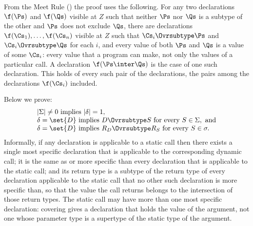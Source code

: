From the Meet Rule () the proof uses the following.
For any two declarations $\f(\Ps)$ and $\f(\Qs)$ visible at $Z$ such that
neither $\Ps$ nor $\Qs$ is a subtype of the other and $\Ps$ does not exclude
$\Qs$, there are declarations $\f(\Cs_1), \ldots, \f(\Cs_n)$ visible at $Z$
such that $\Cs_i \Ovrsubtype \Ps$ and $\Cs_i \Ovrsubtype \Qs$ for each $i$, and
every value of both $\Ps$ and $\Qs$ is a value of some $\Cs_i$: every value that
a program can make, not only the values of a particular call.
A declaration $\f(\Ps \inter \Qs)$ is the case of one such declaration.
This holds of every such pair of the declarations, the pairs among the
declarations $\f(\Cs_i)$ included.

Below we prove:
\[
\begin{array}{l}
|\Sigma| \neq 0 \ \text{implies} \ |\delta| = 1,
\\
\delta = \set{D} \ \text{implies} \ D \Ovrsubtype S \ \text{for every} \ S \in \Sigma, \ \text{and}
\\
\delta = \set{D} \ \text{implies} \ R_D \Ovrsubtype R_S \ \text{for every} \ S \in \sigma.
\end{array}
\]
Informally, if any declaration is applicable to a static call then there
exists a single most specific declaration that is applicable to the
corresponding dynamic call; it is the same as or more specific than every
declaration that is applicable to the static call; and its return type is a
subtype of the return type of every declaration applicable to the static call
that no other such declaration is more specific than, so that the value the
call returns belongs to the intersection of those return types.
The static call may have more than one most specific declaration: covering
gives a declaration that holds the value of the argument, not one whose
parameter type is a supertype of the static type of the argument.

